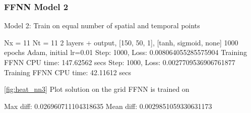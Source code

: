 \subsubsection{FFNN Model 2}
Model 2: Train on equal number of spatial and temporal points

Nx = 11
Nt = 11
2 layers + output, [150, 50, 1], [tanh, sigmoid, none] 
1000 epochs
Adam, initial lr=0.01
Step: 1000, Loss: 0.008064055285575904
Training FFNN CPU time: 147.62562 secs
Step: 1000, Loss: 0.0027709536906761877
Training FFNN CPU time: 42.11612 secs

\autoref{fig:heat_nn3} Plot solution on the grid FFNN is trained on

Max diff: 0.026960711104318635
Mean diff: 0.0029851059330631173

